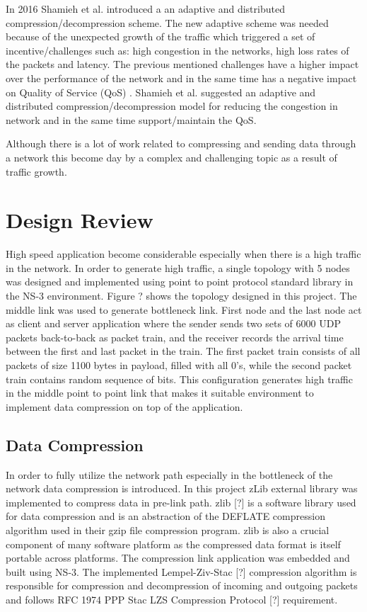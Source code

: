 \documentclass[sigconf]{acmart}
\begin{document}
In 2016 Shamieh et al. introduced a an adaptive and distributed compression/decompression scheme. The new adaptive scheme was needed because of the unexpected growth of the traffic which triggered a set of incentive/challenges such as: high congestion in the networks, high loss rates of the packets and latency. The previous mentioned challenges have a higher impact over the performance of the network and in the same time has a negative impact on Quality of Service (QoS) \cite{shamieh2016adaptive}. Shamieh et al. suggested an adaptive and distributed compression/decompression model for reducing the congestion in network and in the same time support/maintain the QoS.

Although there is a lot of work related to compressing and sending data through a network \cite{tanenbaum2011chapter}\cite{larry2007foundation}\cite{shimamura2010compressing} \cite{deng2012online}\cite{bertsekas1987chapter}\cite{serfozo1999little}\cite{tan2010enhanced} this become day by a complex and challenging topic as a result of traffic growth.

\section{Design Review}
High speed application become considerable especially when there is 
a high traffic in the network. In order to generate high traffic, a single topology 
with 5 nodes was designed and implemented using point to point protocol standard library in 
the NS-3 environment. Figure ? shows the topology designed in this project. 
The middle link was used to generate bottleneck link. First node and the last 
node act as client and server application where the sender sends two sets of 
6000 UDP packets back-to-back as packet train, and the receiver records the 
arrival time between the first and last packet in the train. The first packet train 
consists of all packets of size 1100 bytes in payload, filled with all 0’s, while the 
second packet train contains random sequence of bits. This configuration generates 
high traffic in the middle point to point link that makes it suitable environment to implement
data compression on top of the application.
 

\subsection{Data Compression}

 In order to fully utilize the network path especially in the bottleneck of the network 
 data compression is introduced. In this project zLib external library was implemented 
 to compress data in pre-link path. zlib [?] is a software library used for data compression 
 and is an abstraction of the DEFLATE compression algorithm used in their gzip file 
 compression program. zlib is also a crucial component of many software platform as 
 the compressed data format is itself portable across platforms.
The compression link application was embedded and built using NS-3. 
The implemented Lempel-Ziv-Stac [?] compression algorithm is  responsible for 
compression and decompression of incoming and outgoing packets and follows 
RFC 1974 PPP Stac LZS Compression Protocol [?] requirement.
 
\end{document}
